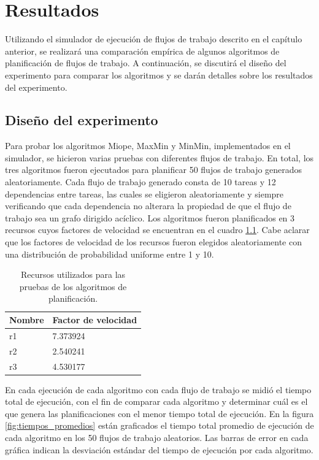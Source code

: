 \chapter{Resultados}

Utilizando el simulador de ejecución de flujos de trabajo descrito en el capítulo anterior, se realizará una comparación empírica de algunos algoritmos de planificación de flujos de trabajo. A continuación, se discutirá el diseño del experimento para comparar los algoritmos y se darán detalles sobre los resultados del experimento.

\section{Diseño del experimento}

Para probar los algoritmos Miope, MaxMin y MinMin, implementados en el simulador, se hicieron varias pruebas con diferentes flujos de trabajo. En total, los tres algoritmos fueron ejecutados para planificar 50 flujos de trabajo generados aleatoriamente. Cada flujo de trabajo generado consta de 10 tareas y 12 dependencias entre tareas, las cuales se eligieron aleatoriamente y siempre verificando que cada dependencia no alterara la propiedad de que el flujo de trabajo sea un grafo dirigido acíclico. Los algoritmos fueron planificados en 3 recursos cuyos factores de velocidad se encuentran en el cuadro \ref{table:resources}. Cabe aclarar que los factores de velocidad de los recursos fueron elegidos aleatoriamente con una distribución de probabilidad uniforme entre 1 y 10.

\begin{table}
\begin{center}
\begin{tabular}{|l|l|}
\hline
Nombre&Factor de velocidad\\
\hline
r1&7.373924\\
\hline
r2&2.540241\\
\hline
r3&4.530177\\
\hline
\end{tabular}
\end{center}
\caption{Recursos utilizados para las pruebas de los algoritmos de planificación.}
\label{table:resources}
\end{table}

En cada ejecución de cada algoritmo con cada flujo de trabajo se midió el tiempo total de ejecución, con el fin de comparar cada algoritmo y determinar cuál es el que genera las planificaciones con el menor tiempo total de ejecución. En la figura \ref{fig:tiempos_promedios} están graficados el tiempo total promedio de ejecución de cada algoritmo en los 50 flujos de trabajo aleatorios. Las barras de error en cada gráfica indican la desviación estándar del tiempo de ejecución por cada algoritmo.

